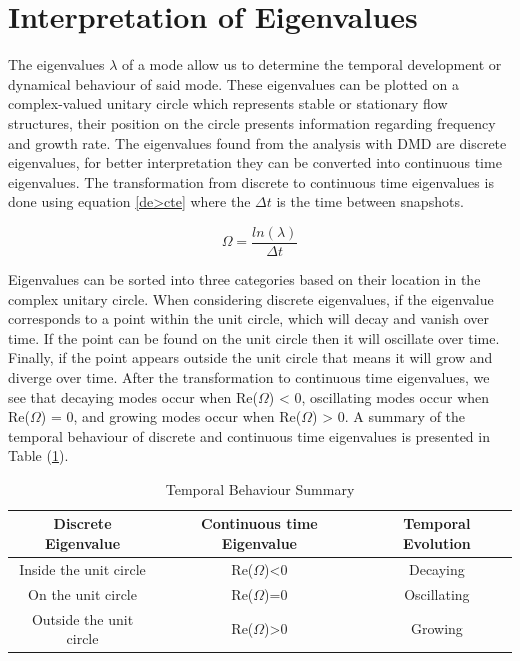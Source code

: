 \documentclass[12pt]{report}
\begin{document}
\section{Interpretation of Eigenvalues}
The eigenvalues $\lambda$ of a mode allow us to determine the temporal development or dynamical behaviour of said mode. These eigenvalues can be plotted on a complex-valued unitary circle which represents stable or stationary flow structures, their position on the circle presents information regarding frequency and growth rate. The eigenvalues found from the analysis with DMD are discrete eigenvalues, for better interpretation they can be converted into continuous time eigenvalues. The transformation from discrete to continuous time eigenvalues is done using equation \eqref{de>cte} where the $\Delta{t}$ is the time between snapshots. 

\begin{equation}\label{de>cte}
    \Omega=\frac{ln(\lambda)}{\Delta{t}}
\end{equation}

Eigenvalues can be sorted into three categories based on their location in the complex unitary circle. When considering discrete eigenvalues, if the eigenvalue corresponds to a point within the unit circle, which will decay and vanish over time. If the point can be found on the unit circle then it will oscillate over time. Finally, if the point appears outside the unit circle that means it will grow and diverge over time. After the transformation to continuous time eigenvalues, we see that decaying modes occur when Re($\Omega$) < 0, oscillating modes occur when Re($\Omega$) = 0, and growing modes occur when Re($\Omega$) > 0. A summary of the temporal behaviour of discrete and continuous time eigenvalues is presented in Table (\ref{tab:tempsum}). 

\begin{table}[H] 
\caption{Temporal Behaviour Summary} \label{tab:tempsum}
\centering
\begin{adjustbox}{width=1\textwidth}
\small
\begin{tabular}{|c|c|c|}
\hline
{\textbf{Discrete Eigenvalue}} & {\textbf{Continuous time Eigenvalue}} & {\textbf{Temporal Evolution}} \\ \hline
Inside the unit circle        & Re($\Omega$)<0              & Decaying  \\ \hline
On the unit circle            & Re($\Omega$)=0              & Oscillating   \\ \hline
Outside the unit circle       & Re($\Omega$)>0              & Growing       \\ \hline
\end{tabular}
\end{adjustbox}
\end{table}
\noindent
\end{document}
